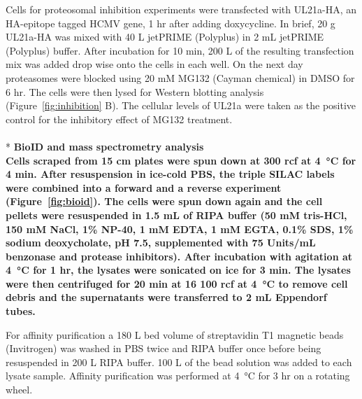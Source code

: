Cells for proteosomal inhibition experiments were transfected with UL21a-HA, an HA-epitope tagged HCMV gene, 1 hr after adding doxycycline. In brief, 20 \textmu g UL21a-HA was mixed with 40 \textmu L jetPRIME (Polyplus) in 2 mL jetPRIME (Polyplus) buffer. After incubation for 10 min, 200 \textmu L of the resulting transfection mix was added drop wise onto the cells in each well. On the next day proteasomes were blocked using 20 mM MG132 (Cayman chemical) in DMSO for 6 hr. The cells were then lysed for Western blotting analysis (Figure~\ref{fig:inhibition} B). The cellular levels of UL21a were taken as the positive control for the inhibitory effect of MG132 treatment.
\\
\\*
\bfseries{BioID and mass spectrometry analysis}\\
\normalfont Cells scraped from 15 cm plates were spun down at 300 rcf at \SI{4}{\celsius} for 4 min. After resuspension in ice-cold PBS, the triple SILAC labels were combined into a forward and a reverse experiment (Figure~\ref{fig:bioid}). The cells were spun down again and the cell pellets were resuspended in 1.5 mL of RIPA buffer (50 mM tris-HCl, 150 mM NaCl, 1\% NP-40, 1 mM EDTA, 1 mM EGTA, 0.1\% SDS, 1\% sodium deoxycholate, pH 7.5, supplemented with 75 Units/mL benzonase and protease inhibitors). After incubation with agitation at \SI{4}{\celsius} for 1 hr, the lysates were sonicated on ice for 3 min. The lysates were then centrifuged for 20 min at 16 100 rcf at \SI{4}{\celsius} to remove cell debris and the supernatants were transferred to 2 mL Eppendorf tubes.

For affinity purification a 180 {}\textmu L bed volume of streptavidin T1 magnetic beads (Invitrogen) was washed in PBS twice and RIPA buffer once before being resuspended in 200 {}\textmu L RIPA buffer. 100 {}\textmu L of the bead solution was added to each lysate sample. Affinity purification was performed at \SI{4}{\celsius} for 3 hr on a rotating wheel.

